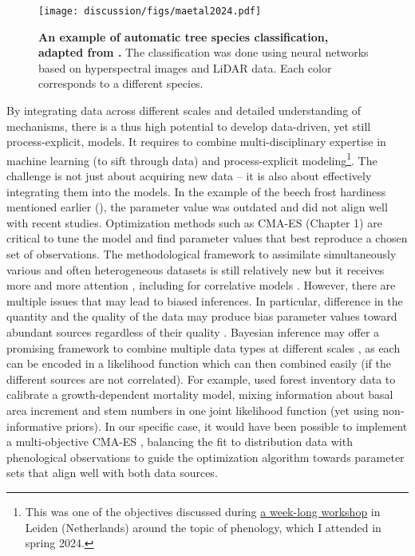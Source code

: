 \begin{figure}[h]
\centering
\texttt{[image: discussion/figs/maetal2024.pdf]}
\caption{\textbf{An example of automatic tree species classification, adapted from \citet{Ma2024}.} The classification was done using neural networks based on hyperspectral images and LiDAR data. Each color corresponds to a different species.}
\label{fig:autospecies}
\end{figure}

By integrating data across different scales and detailed understanding of mechanisms, there is a thus high potential to develop data-driven, yet still process-explicit, models. It requires to combine multi-disciplinary expertise in machine learning (to sift through data) and process-explicit modeling\footnote{This was one of the objectives discussed during \href{https://www.lorentzcenter.nl/fair-phenological-modelling.html}{a week-long workshop} in Leiden (Netherlands) around the topic of phenology, which I attended in spring 2024.}. The challenge is not just about acquiring new data -- it is also about effectively integrating them into the models. In the example of the beech frost hardiness mentioned earlier (), the parameter value was outdated and did not align well with recent studies. Optimization methods such as CMA-ES (Chapter 1) are critical to tune the model and find parameter values that best reproduce a chosen set of observations. The methodological framework to assimilate simultaneously various and often heterogeneous datasets is still relatively new but it receives more and more attention \citep{Zipkin2021}, including for correlative models \citep{Isaac2020}. However, there are multiple issues that may lead to biased inferences. In particular, difference in the quantity and the quality of the data may produce bias parameter values toward abundant sources regardless of their quality \citep{Zipkin2021}. Bayesian inference may offer a promising framework to combine multiple data types at different scales \citep{Hartig2012}, as each can be encoded in a likelihood function which can then combined easily (if the different sources are not correlated). For example, \citet{Cailleret2020} used forest inventory data to calibrate a growth-dependent mortality model, mixing information about basal area increment and stem numbers in one joint likelihood function (yet using non-informative priors). In our specific case, it would have been possible to implement a multi-objective CMA-ES \citep{Igel2007}, balancing the fit to distribution data with phenological observations to guide the optimization algorithm towards parameter sets that align well with both data sources.
